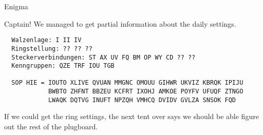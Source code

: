 \begin{problem}
Enigma

\noindent
Captain! We managed to get partial information about the daily settings.

\begin{Verbatim}
  Walzenlage: I II IV
  Ringstellung: ?? ?? ??
  Steckerverbindungen: ST AX UV FQ BM OP WY CD ?? ??
  Kenngruppen: QZE TRF IOU TGB

  SOP HIE = IOUTO XLIVE QVUAN MMGNC OMOUU GIHWR UKVIZ KBRQK IPIJU
            BWBTO ZHFNT BBZEU KCFRT IXOHJ AMKOE POYFV UFUQF ZTNGO
            LWAQK DQTVG INUFT NPZQH VMHCQ DVIDV GVLZA SNSOK FQD
\end{Verbatim}
          If we could get the ring settings, the next tent over says we should be able figure out the
          rest of the plugboard.
\end{problem}

